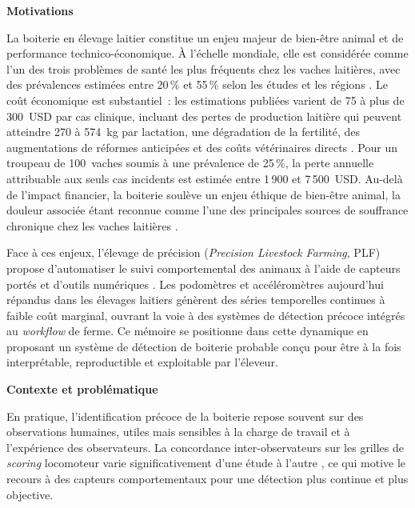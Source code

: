 \begin{introduction}

\newcommand{\introheading}[1]{%
  \par\medskip
  \noindent\textbf{#1}\par\smallskip
}

\introheading{Motivations}
La boiterie en élevage laitier constitue un enjeu majeur de bien-être animal et de
performance technico-économique. À l'échelle mondiale, elle est considérée comme l'un des
trois problèmes de santé les plus fréquents chez les vaches laitières, avec des prévalences
estimées entre 20\,\% et 55\,\% selon les études et les régions
\citep{whay2003assessment,flower2006effect}. Le coût économique est substantiel~: les
estimations publiées varient de 75 à plus de 300~USD par cas clinique, incluant des pertes
de production laitière qui peuvent atteindre 270 à 574~kg par lactation, une dégradation
de la fertilité, des augmentations de réformes anticipées et des coûts vétérinaires
directs \citep{green2002financial,bruijnis2010assessing}. Pour un troupeau de 100~vaches
soumis à une prévalence de 25\,\%, la perte annuelle attribuable aux seuls cas incidents
est estimée entre 1\,900 et 7\,500~USD. Au-delà de l'impact financier, la boiterie soulève
un enjeu éthique de bien-être animal, la douleur associée étant reconnue comme l'une des
principales sources de souffrance chronique chez les vaches laitières
\citep{whay2003assessment}.

Face à ces enjeux, l'élevage de précision (\textit{Precision Livestock Farming}, PLF)
propose d'automatiser le suivi comportemental des animaux à l'aide de capteurs portés
et d'outils numériques \citep{palma2025scoping,michelena2025plf_review}. Les
podomètres et accéléromètres aujourd'hui répandus dans les élevages laitiers génèrent
des séries temporelles continues à faible coût marginal, ouvrant la voie à des systèmes
de détection précoce intégrés au \textit{workflow} de ferme. Ce mémoire se positionne
dans cette dynamique en proposant un système de détection de boiterie probable conçu
pour être à la fois interprétable, reproductible et exploitable par l'éleveur.

\introheading{Contexte et problématique}
En pratique, l'identification précoce de la boiterie repose souvent sur des observations
humaines, utiles mais sensibles à la charge de travail et à l'expérience des observateurs.
La concordance inter-observateurs sur les grilles de \textit{scoring} locomoteur varie
significativement d'une étude à l'autre
\citep{sprecher1997lameness,flower2006effect}, ce qui motive le recours à des capteurs
comportementaux pour une détection plus continue et plus objective.


\end{introduction}
